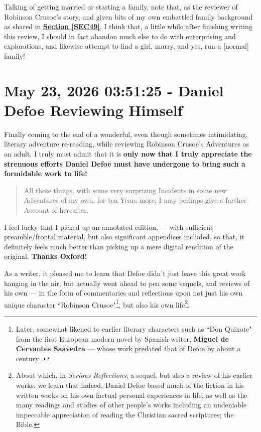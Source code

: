\documentclass[a4paper]{article}
\begin{document}
Talking of getting married or starting a family, note that, as the reviewer of Robinson Crusoe's story, and given bits of my own embattled family background as shared in \textbf{\hyperref[SEC49]{Section \ref{SEC49}}}, I think that, a little while after finishing writing this review, I should in fact abandon much else to do with enterprising and explorations, and likewise attempt to find a girl, marry, and yes, run a [normal] family!






\section{May 23, 2026 03:51:25 - Daniel Defoe Reviewing Himself}
\label{SEC76}


Finally coming to the end of a wonderful, even though sometimes intimidating, literary adventure re-reading, while reviewing Robinson Crusoe's Adventures as an adult, I truly must admit that it is \textbf{only now that I truly appreciate the strenuous efforts Daniel Defoe must have undergone to bring such a formidable work to life!} 


\noindent
\begin{minipage}{1\textwidth}
\vspace{1em}
\begin{quotation}
{\ttfamily


All these things, with some very surprizing Incidents in some new Adventures of my own, for ten Years more, I may perhaps give a farther Account of hereafter.

}
\end{quotation}
\vspace{1em}
\end{minipage}


I feel lucky that I picked up an annotated edition, \cite{Defoe2007} --- with sufficient preamble/frontal material, but also significant appendices included, so that, it definitely feels much better than picking up a mere digital rendition of the original. \textbf{Thanks Oxford!}

As a writer, it pleased me to learn that Defoe didn't just leave this great work hanging in the air, but actually went ahead to pen some sequels, and reviews of his own --- in the form of commentaries and reflections upon not just his own unique character ``Robinson Crusoe"\footnote{Later, somewhat likened to earlier literary characters such as ``Don Quixote" from the first European modern novel by Spanish writer, \textbf{Miguel de Cervantes Saavedra} --- whose work predated that of Defoe by about a century \cite{copilot_assistant}.}, but also his own life\footnote{About which, in \textit{Serious Reflections}, a sequel, but also a review of his earlier works, we learn that indeed, Daniel Defoe based much of the fiction in his written works on his own factual personal experiences in life, as well as the many readings and studies of other people's works including an undeniable impeccable appreciation of reading the Christian sacred scriptures; the Bible.}.
\end{document}
